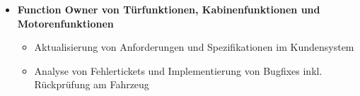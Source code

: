\documentclass[11pt,a4paper,sans]{moderncv}        %
\begin{document}
{\begin{itemize}
  \item \textbf{Function Owner von Türfunktionen, Kabinenfunktionen und Motorenfunktionen}
  \begin{itemize}
    \item Aktualisierung von Anforderungen und Spezifikationen im Kundensystem
    \item Analyse von Fehlertickets und Implementierung von Bugfixes inkl. Rückprüfung am Fahrzeug  
  \end{itemize} 
\end{itemize}}


\end{document}
